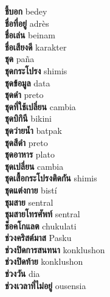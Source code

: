 \textbf{ ชี้บอก  } bedey \\
\textbf{ ชื่อที่อยู่  } adrès \\
\textbf{ ชื่อเล่น  } beinam \\
\textbf{ ชื่อเสียงดี  } karakter \\
\textbf{ ชุด  } paña \\
\textbf{ ชุดกระโปรง  } shimis \\
\textbf{ ชุดข้อมูล  } data \\
\textbf{ ชุดดำ  } preto \\
\textbf{ ชุดที่ใช้เปลี่ยน  } cambia \\
\textbf{ ชุดบิกินี  } bikini \\
\textbf{ ชุดว่ายน้ำ  } batpak \\
\textbf{ ชุดสีดำ  } preto \\
\textbf{ ชุดอาหาร  } plato \\
\textbf{ ชุดเปลี่ยน  } cambia \\
\textbf{ ชุดเสื้อกระโปรงติดกัน  } shimis \\
\textbf{ ชุดแต่งกาย  } bistí \\
\textbf{ ชุมสาย  } sentral \\
\textbf{ ชุมสายโทรศัพท์  } sentral \\
\textbf{ ช็อคโกแลต  } chukulati \\
\textbf{ ช่วงคริสต์มาส  } Pasku \\
\textbf{ ช่วงปิดการสนทนา  } konklushon \\
\textbf{ ช่วงปิดท้าย  } konklushon \\
\textbf{ ช่วงวัน  } dia \\
\textbf{ ช่วงเวลาที่ไม่อยู่  } ousensia \\

